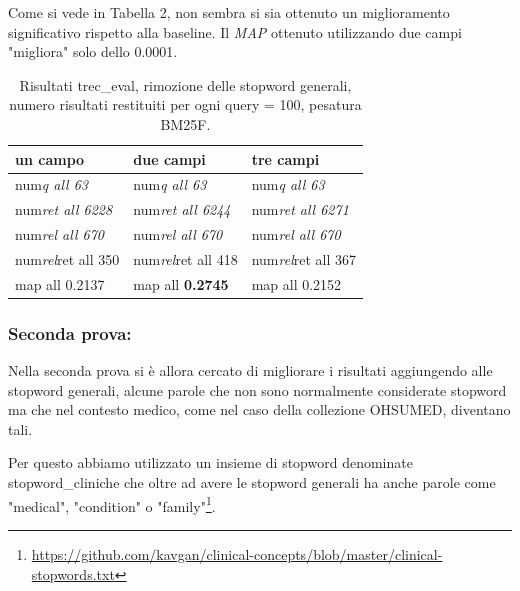 \documentclass[runningheads]{llncs}
\begin{document}
Come si vede in Tabella 2, non sembra si sia ottenuto un miglioramento significativo rispetto alla baseline. Il \textit{MAP} ottenuto utilizzando due campi "migliora" solo dello 0.0001.
\begin{table}
\vspace{-3mm}
\centering
\begin{tabular}{lll}
\hline
\textbf{ un campo }           & \textbf{ due campi }           & \textbf{ tre campi }            \\ \hline
 num\textit{q all 63 }       &  num\textit{q all 63 }       &  num\textit{q all 63 }        \\
 num\textit{ret all 6228 }  &  num\textit{ret all 6244 }  &  num\textit{ret all 6271 }   \\
 num\textit{rel all 670 }    &  num\textit{rel all 670 }    &  num\textit{rel all 670 }     \\
 num\textit{rel}ret all 350  &  num\textit{rel}ret all 418  &  num\textit{rel}ret all 367   \\
map all 0.2137               & map all \bf 0.2745               & map all 0.2152          \\ \hline
\end{tabular}

\caption{ Risultati trec\_eval, rimozione delle stopword generali, numero risultati restituiti per ogni query = 100, pesatura BM25F.}
\vspace{-7mm}
\end{table}

\subsubsection{Seconda prova:}

Nella seconda prova si \`e allora cercato di migliorare i risultati aggiungendo alle stopword generali, alcune parole che non sono normalmente considerate stopword ma che nel contesto medico, come nel caso della collezione OHSUMED, diventano tali.

Per questo abbiamo utilizzato un insieme di stopword denominate stopword\_cliniche che oltre ad avere le stopword generali ha anche parole come "medical", "condition" o "family"\footnote{ \url{https://github.com/kavgan/clinical-concepts/blob/master/clinical-stopwords.txt}}.
\end{document}

